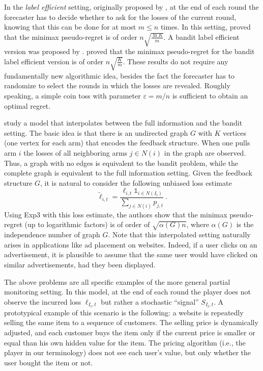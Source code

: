 \documentclass[11pt]{hackednow}
\def\ds1{\mathds{1}}
\renewcommand{\epsilon}{\varepsilon}
\renewcommand{\tilde}{\widetilde}
\begin{document}
In the {\em label efficient} setting, originally proposed by \cite{HP97}, at the end of each round the forecaster has to decide whether to ask for the losses of the current round, knowing that this can be done for at most $m \leq n$ times. In this setting, \cite{CLS05} proved that the minimax pseudo-regret is of order $n \sqrt{\frac{\ln K}{m}}$. A bandit label efficient version was proposed by \cite{AAGO06}. \cite{AB10} proved that the minimax pseudo-regret for the bandit label efficient version is of order $n \sqrt{\frac{K}{m}}$. These results do not require any fundamentally new algorithmic idea, besides the fact the forecaster has to randomize to select the rounds in which the losses are revealed. Roughly speaking, a simple coin toss with parameter $\epsilon = m/n$ is sufficient to obtain an optimal regret.

\cite{MS11} study a model that interpolates between the full information and the bandit setting. The basic idea is that there is an undirected graph $G$ with $K$ vertices (one vertex for each arm) that encodes the feedback structure. When one pulls arm $i$ the losses of all neighboring arms $j \in N(i)$ in the graph are observed. Thus, a graph with no edges is equivalent to the bandit problem, while the complete graph is equivalent to the full information setting. Given the feedback structure $G$, it is natural to consider the following unbiased loss estimate
\[
    \tilde{\ell}_{i,t} = \frac{\ell_{i,t} \ds1_{i \in N(I_t)}}{\sum_{j \in N(i)} p_{j,t}}~.
\]
Using Exp3 with this loss estimate, the authors show that the minimax pseudo-regret (up to logarithmic factors) is of order of $\sqrt{\alpha(G) n}$, where $\alpha(G)$ is the independence number of graph $G$. Note that this interpolated setting naturally arises in applications like ad placement on websites. Indeed, if a user clicks on an advertisement, it is plausible to assume that the same user would have clicked on similar advertisements, had they been displayed.

The above problems are all specific examples of the more general partial monitoring setting. In this model, at the end of each round the player does not observe the incurred loss $\ell_{I_t,t}$ but rather a stochastic ``signal'' $S_{I_t,t}$. A prototypical example of this scenario is the following: a website is repeatedly selling the same item to a sequence of customers. The selling price is dynamically adjusted, and each customer buys the item only if the current price is smaller or equal than his own hidden value for the item. The pricing algorithm (i.e., the player in our terminology) does not see each user's value, but only whether the user bought the item or not.
\end{document}
